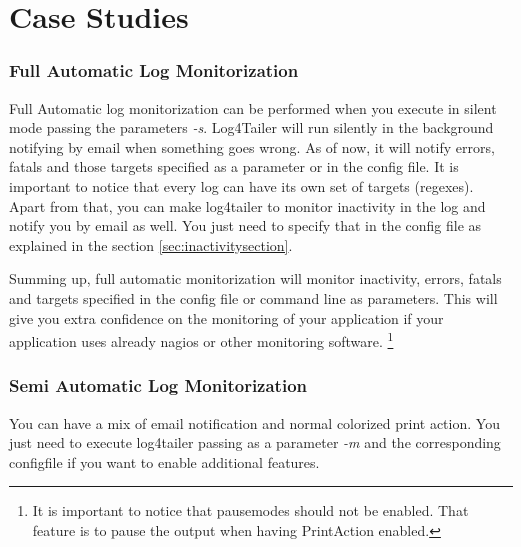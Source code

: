 \part{Case Studies}
\section{Full Automatic Log Monitorization}
Full Automatic log monitorization can be performed when you execute \logftailer{} 
in silent mode passing the parameters \emph{-s}. 
Log4Tailer will run silently in the background notifying by email 
when something goes wrong. As of now, it will notify errors, fatals and those targets 
specified as a parameter or in the config file. It is important to notice that every log 
can have its own set of targets (regexes). Apart from that, you can make log4tailer 
to monitor inactivity in the log and notify you by email as well. You just need to specify 
that in the config file as explained in the section \ref{sec:inactivitysection}.

Summing up, full automatic monitorization will monitor inactivity, errors, fatals and targets specified 
in the config file or command line as parameters. This will give you extra confidence on the 
monitoring of your application if your application uses already nagios or other monitoring software.
\footnote{It is important to notice that pausemodes should not be enabled. That feature is 
to pause the output when having PrintAction enabled.}

\section{Semi Automatic Log Monitorization}
You can have a mix of email notification and normal colorized print action. You just 
need to execute log4tailer passing as a parameter \emph{-m} and the 
corresponding configfile if you want to enable additional features. 

